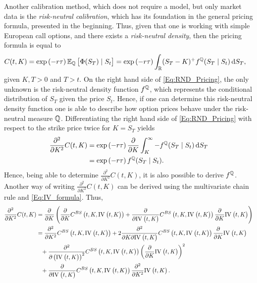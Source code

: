 Another calibration method, which does not require a model, but only market data is the \emph{risk-neutral calibration}, which has its foundation in the general pricing formula, presented in the beginning. Thus, given that one is working with simple European call options, and there exists a \emph{risk-neutral density}, then the pricing formula is equal to
\begin{align}\label{Eq:RND_Pricing}
    C(t,K) &= \exp\left(-r\tau\right)\E[\Q]{\Phi(S_T)\mid S_t} = \exp\left(-r\tau\right)\int_\R(S_T-K)^+f^\Q(S_T\mid S_t)\,\mathrm{d}S_T,
\end{align}
given $K,T>0$ and $T>t$. On the right hand side of \eqref{Eq:RND_Pricing}, the only unknown is the risk-neutral density function $f^{\mathbb{Q}}$, which represents the conditional distribution of $S_T$ given the price $S_t$. Hence, if one can determine this risk-neutral density function one is able to describe how option prices behave under the risk-neutral measure $\mathbb{Q}$. Differentiating the right hand side of \eqref{Eq:RND_Pricing} with respect to the strike price twice for $K=S_T$ yields
\begin{align}\begin{aligned}\label{Eq:PartialC}
    \frac{\partial^2}{\partial K^2}C(t,K) &= \exp\left(-r\tau\right)\frac{\partial}{\partial K}\int_K^\infty -f^{\mathbb{Q}}(S_T\mid S_t)\,\mathrm{d}S_T\\
    &=\exp\left(-r\tau\right)f^{\mathbb{Q}}(S_T\mid S_t).
\end{aligned}\end{align}
Hence, being able to determine $\frac{\partial^2}{\partial K^2}C(t,K)$, it is also possible to derive $f^{\mathbb{Q}}$. Another way of writing $\frac{\partial^2}{\partial K^2}C(t,K)$ can be derived using the multivariate chain rule and \eqref{Eq:IV_formula}. Thus,
\begin{align}\begin{split}\label{Eq:RND_Derivatives}
    \frac{\partial^2}{\partial K^2} C(t,K) &= \frac{\partial}{\partial K}\left(\frac{\partial}{\partial K} C^{BS}\left(t,K,\IV{t,K}\right) + \frac{\partial}{\partial\IV{t,K}} C^{BS}\left(t,K,\IV{t,K}\right)\frac{\partial}{\partial K}\IV{t,K}\right)\\
    &= \frac{\partial^2}{\partial K^2}C^{BS}\left(t,K,\IV{t,K}\right)+2\frac{\partial^2}{\partial K\partial\IV{t,K}}C^{BS}\left(t,K,\IV{t,K}\right)\frac{\partial}{\partial K}\IV{t,K}\\
    &\phantom{=} +\frac{\partial^2}{\partial\left(\IV{t,K}\right)^2}C^{BS}\left(t,K,\IV{t,K}\right)\left(\frac{\partial}{\partial K}\IV{t,K}\right)^2\\&\phantom{=} +\frac{\partial}{\partial\IV{t,K}}C^{BS}\left(t,K,\IV{t,K}\right)\frac{\partial^2}{\partial K^2}\IV{t,K}.
\end{split}\end{align}
